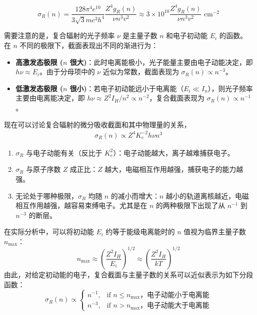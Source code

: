 \begin{equation}
    \sigma_R(n) = \frac{128\pi^4 e^{10}}{3\sqrt{3} m c^3 h^4} \frac{Z^4 g_R(n)}{\nu n^3 v^2} \approx 3 \times 10^{10} \frac{Z^4 g_R(n)}{\nu n^3 v^2} \text{ cm}^{-2}
\end{equation}

需要注意的是，复合辐射的光子频率 $\nu$ 是主量子数 $n$ 和电子初动能 $E_i$ 的函数。在 $n$ 不同的极限下，截面表现出不同的渐进行为：

\begin{itemize}
    \item \textbf{高激发态极限 ($n$ 很大)}：此时电离能极小，光子能量主要由电子动能决定，即 $h\nu \approx E_i$。由于分母项中的 $\nu$ 近似为常数，截面表现为 $\sigma_R(n) \propto n^{-3}$。
    \item \textbf{低激发态极限 ($n$ 很小)}：若电子初动能远小于电离能（$E_i \ll I_n$），则光子频率主要由电离能决定，即 $h\nu \approx Z^2 I_H / n^2 \propto n^{-2}$，复合截面表现为 $\sigma_R(n) \propto n^{-1}$。
\end{itemize}
现在可以讨论复合辐射的微分吸收截面和其中物理量的关系，
\begin{align}
    \sigma_{R}(n) \propto Z^4 K_e^{-2} h\nu n^3 \nonumber
\end{align}
\begin{enumerate}
    \item $\sigma_R$ 与电子动能有关（反比于 $K_e^2$）：电子动能越大，离子越难捕获电子。
    \item $\sigma_R$ 与原子序数 $Z$ 成正比：$Z$ 越大，电磁相互作用越强，捕获电子的能力越强。
    \item 无论处于哪种极限，$\sigma_R$ 均随 $n$ 的减小而增大：$n$ 越小的轨道离核越近，电磁相互作用越强，越容易束缚电子。尤其是在 $n$ 的两种极限下出现了从 $n^{-1}$ 到 $n^{-3}$ 的断层。
\end{enumerate}

在实际分析中，可以将初动能 $E_i$ 约等于能级电离能时的 $n$ 值视为临界主量子数 $n_{\max}$：
\begin{equation}
    n_{\max} \approx \left( \frac{Z^2 I_H}{E_i} \right)^{1/2} \approx \left( \frac{Z^2 I_H}{kT} \right)^{1/2} \nonumber
\end{equation}
由此，对给定初动能的电子，复合截面与主量子数的关系可以近似表示为如下分段函数：
\begin{equation}
    \sigma_R(n) \propto 
    \begin{cases} 
    n^{-1}, & \text{if } n \le n_{\max}，\text{电子动能小于电离能} \\
    n^{-3}, & \text{if } n > n_{\max} ，\text{电子动能大于电离能} 
    \end{cases}
\end{equation}

